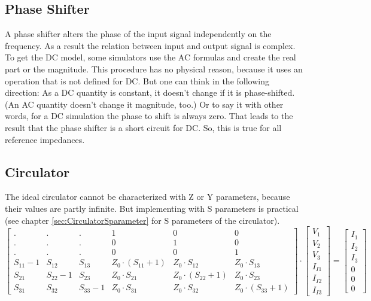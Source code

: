 \documentclass[10pt]{report}
\begin{document}
\subsection{Phase Shifter}

A phase shifter alters the phase of the input signal independently on
the frequency.  As a result the relation between input and output
signal is complex.  To get the DC model, some simulators use the AC
formulas and create the real part or the magnitude.  This procedure
has no physical reason, because it uses an operation that is not
defined for DC.  But one can think in the following direction: As a DC
quantity is constant, it doesn't change if it is phase-shifted.  (An
AC quantity doesn't change it magnitude, too.)  Or to say it with
other words, for a DC simulation the phase to shift is always zero.
That leads to the result that the phase shifter is a short circuit for
DC.  So, this is true for all reference impedances.

\subsection{Circulator}

The ideal circulator cannot be characterized with Z or Y parameters,
because their values are partly infinite.  But implementing with S
parameters is practical (see chapter \ref{sec:CirculatorSparameter}
for S parameters of the circulator).
\begin{equation}
\begin{bmatrix}
 . & . & .  &  1 & 0 & 0\\
 . & . & .  &  0 & 1 & 0\\
 . & . & .  &  0 & 0 & 1\\
S_{11}-1 &  S_{12} & S_{13} & Z_0\cdot (S_{11}+1) & Z_0\cdot S_{12} & Z_0\cdot S_{13}\\
S_{21} &  S_{22}-1 & S_{23} & Z_0\cdot S_{21} & Z_0\cdot (S_{22}+1) & Z_0\cdot S_{23}\\
S_{31} &  S_{32} & S_{33}-1 & Z_0\cdot S_{31} & Z_0\cdot S_{32} & Z_0\cdot (S_{33}+1)
\end{bmatrix}
\cdot
\begin{bmatrix}
V_{1}\\
V_{2}\\
V_{3}\\
I_{I1}\\
I_{I2}\\
I_{I3}
\end{bmatrix}
=
\begin{bmatrix}
I_{1}\\
I_{2}\\
I_{3}\\
0\\
0\\
0
\end{bmatrix}
\end{equation}
\end{document}
